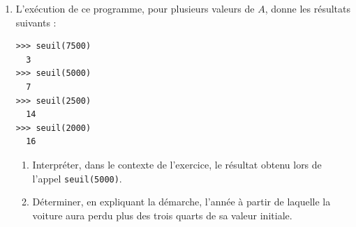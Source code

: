 \documentclass[10pt]{article}
\begin{document}
\begin{enumerate}
\begin{minipage}[t]{0.62\linewidth}
		Recopier et compléter ce programme afin qu'il renvoie, après exécution, la plus petite valeur de $n$ telle que \quad$u_n < A$,\quad où $A$ est un nombre réel strictement positif.
	\end{minipage}\hfill
	\begin{minipage}[t]{5.5cm}
		\begin{lstlisting}[style=python,numbers=none,xleftmargin=0mm,xrightmargin=0mm]
def seuil(A) :
	N = 0
	U = 10000
	while ......... :
		U = .......
		N = N+1
	return N
\end{lstlisting}
	\end{minipage}

	\item L'exécution de ce programme, pour plusieurs valeurs de $A$, donne les résultats suivants :

\begin{lstlisting}[style=python,xleftmargin=5cm,xrightmargin=5cm,numbers=none]
>>> seuil(7500)
  3
>>> seuil(5000)
  7
>>> seuil(2500)
  14
>>> seuil(2000)
  16
\end{lstlisting}

	\begin{enumerate}
		\item Interpréter, dans le contexte de l'exercice, le résultat obtenu lors de l'appel \texttt{seuil(5000)}.

		\item Déterminer, en expliquant la démarche, l'année à partir de laquelle la voiture aura perdu plus des trois quarts de sa valeur initiale.
	\end{enumerate}
\end{enumerate}
\end{document}
